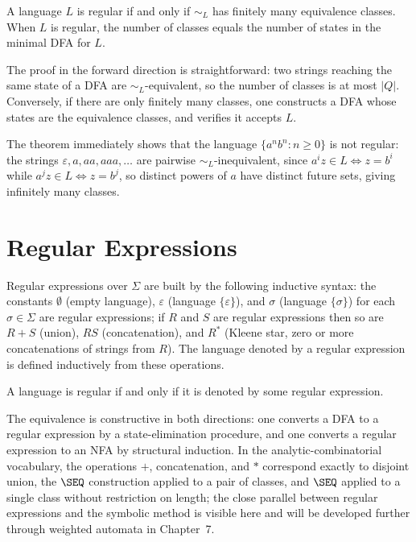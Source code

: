 \begin{theorem}
A language $L$ is regular if and only if $\sim_L$ has finitely many equivalence classes. When $L$ is regular, the number of classes equals the number of states in the minimal DFA for $L$.
\end{theorem}

The proof in the forward direction is straightforward: two strings reaching the same state of a DFA are $\sim_L$-equivalent, so the number of classes is at most $|Q|$. Conversely, if there are only finitely many classes, one constructs a DFA whose states are the equivalence classes, and verifies it accepts $L$.

The theorem immediately shows that the language $\{a^n b^n : n \ge 0\}$ is not regular: the strings $\varepsilon, a, aa, aaa, \ldots$ are pairwise $\sim_L$-inequivalent, since $a^i z \in L \iff z = b^i$ while $a^j z \in L \iff z = b^j$, so distinct powers of $a$ have distinct future sets, giving infinitely many classes.

\section{Regular Expressions}

Regular expressions over $\Sigma$ are built by the following inductive syntax: the constants $\emptyset$ (empty language), $\varepsilon$ (language $\{\varepsilon\}$), and $\sigma$ (language $\{\sigma\}$) for each $\sigma \in \Sigma$ are regular expressions; if $R$ and $S$ are regular expressions then so are $R + S$ (union), $RS$ (concatenation), and $R^*$ (Kleene star, zero or more concatenations of strings from $R$). The language denoted by a regular expression is defined inductively from these operations.

\begin{theorem}[Kleene]
A language is regular if and only if it is denoted by some regular expression.
\end{theorem}

The equivalence is constructive in both directions: one converts a DFA to a regular expression by a state-elimination procedure, and one converts a regular expression to an NFA by structural induction. In the analytic-combinatorial vocabulary, the operations $+$, concatenation, and $*$ correspond exactly to disjoint union, the $\SEQ$ construction applied to a pair of classes, and $\SEQ$ applied to a single class without restriction on length; the close parallel between regular expressions and the symbolic method is visible here and will be developed further through weighted automata in Chapter~7.

